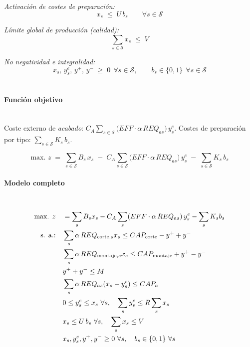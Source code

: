 \emph{Activación de costes de preparación:}
\begin{equation}
    x_s \;\le\; U\,b_s \qquad \forall s \in \mathcal{S}
\end{equation}

\emph{Límite global de producción (calidad):}
\begin{equation}
    \sum_{s \in \mathcal{S}} x_s \;\le\; V
\end{equation}

\emph{No negatividad e integralidad:}
\begin{equation}
    x_s,\, y_s^{e},\, y^+,\, y^- \;\ge\; 0 \ \ \forall s \in \mathcal{S}, 
    \qquad b_s \in \{0,1\} \ \ \forall s \in \mathcal{S}
\end{equation}
\\

\paragraph{Función objetivo}\mbox{}\\
Coste externo de \textit{acabado}: 
\(
C_A \sum_{s \in \mathcal{S}} \big(EFF \cdot \alpha\,REQ_{a s}\big)\, y_s^{e}.
\)
Costes de preparación por tipo: \(\sum_{s \in \mathcal{S}} K_s\, b_s\).

\begin{equation}
\mbox{max. } z \;=\; \sum_{s \in \mathcal{S}} B_s\, x_s 
\;-\; C_A \sum_{s \in \mathcal{S}} \big(EFF \cdot \alpha\,REQ_{a s}\big)\, y_s^{e}
\;-\; \sum_{s \in \mathcal{S}} K_s\, b_s
\end{equation}

\paragraph{Modelo completo}\mbox{}\\
\begin{align}
\mbox{max. } z \quad &= \sum_{s} B_s x_s 
- C_A \sum_{s} (EFF \cdot \alpha\,REQ_{a s})\, y_s^{e}
- \sum_{s} K_s b_s \notag \\
\mbox{s. a.:}\quad 
& \sum_{s} \alpha\,REQ_{\text{corte},s} x_s \le CAP_{\text{corte}} - y^+ + y^- \notag \\
& \sum_{s} \alpha\,REQ_{\text{montaje},s} x_s \le CAP_{\text{montaje}} + y^+ - y^- \notag \\
& y^+ + y^- \le M \notag \\
& \sum_{s} \alpha\,REQ_{a s} (x_s - y_s^{e}) \le CAP_a \notag \\
& 0 \le y_s^{e} \le x_s \ \forall s,\quad \sum_{s} y_s^{e} \le R \sum_{s} x_s \notag \\
& x_s \le U\,b_s \ \forall s,\quad \sum_{s} x_s \le V \notag \\
& x_s, y_s^{e}, y^+, y^- \ge 0 \ \forall s,\quad b_s \in \{0,1\} \ \forall s \notag
\end{align}


